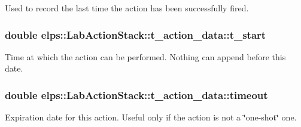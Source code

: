 Used to record the last time the action has been successfully fired. \hypertarget{structelps_1_1_lab_action_stack_1_1t__action__data_a5912a70c6e7288f82141238ef1bbeb09}{
\subsubsection[{t\+\_\+start}]{\setlength{\rightskip}{0pt plus 5cm}double elps\+::\+Lab\+Action\+Stack\+::t\+\_\+action\+\_\+data\+::t\+\_\+start}}\label{structelps_1_1_lab_action_stack_1_1t__action__data_a5912a70c6e7288f82141238ef1bbeb09}
Time at which the action can be performed. Nothing can append before this date. \hypertarget{structelps_1_1_lab_action_stack_1_1t__action__data_af2d25275bc009b026306bb8d847a1129}{
\subsubsection[{timeout}]{\setlength{\rightskip}{0pt plus 5cm}double elps\+::\+Lab\+Action\+Stack\+::t\+\_\+action\+\_\+data\+::timeout}}\label{structelps_1_1_lab_action_stack_1_1t__action__data_af2d25275bc009b026306bb8d847a1129}
Expiration date for this action. Useful only if the action is not a \char`\"{}one-\/shot\char`\"{} one. 